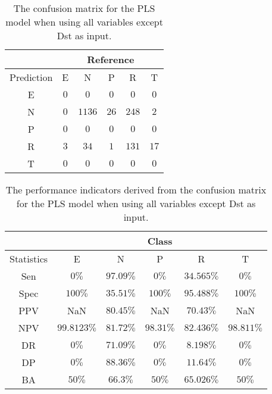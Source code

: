 \begin{table}[!ht]
	\centering
	\begin{tabular}{|c|c|c|c|c|c|}
		\hline
		 & \multicolumn{5}{|c|}{Reference} \\ \hline
		 Prediction & E & N & P & R & T \\ \hline
		 E & $0$ & $0$ & $0$ & $0$ & $0$ \\ \hline
		 N & $0$ & $1136$ & $26$ & $248$ & $2$ \\ \hline
		 P & $0$ & $0$ & $0$ & $0$ & $0$ \\ \hline
		 R & $3$ & $34$ & $1$ & $131$ & $17$ \\ \hline
		 T & $0$ & $0$ & $0$ & $0$ & $0$ \\ \hline
	\end{tabular}
	\caption{The confusion matrix for the PLS model when using all variables except Dst as input.}
	\label{tab:cm:noDst:pls}
\end{table}

\begin{table}[!ht]
	\centering
	\begin{tabular}{|c|c|c|c|c|c|}
		\hline
		 & \multicolumn{5}{c|}{Class} \\ \hline
		Statistics & E & N & P & R & T \\ \hline
		Sen & $0\%$ & $97.09\%$ & $0\%$ & $34.565\%$ & $0\%$ \\ \hline
		Spec & $100\%$ & $35.51\%$ & $100\%$ & $95.488\%$ & $100\%$ \\ \hline
		PPV & NaN & $80.45\%$ & NaN & $70.43\%$ & NaN \\ \hline
		NPV & $99.8123\%$ & $81.72\%$ & $98.31\%$ & $82.436\%$ & $98.811\%$ \\ \hline
		DR & $0\%$ & $71.09\%$ & $0\%$ & $8.198\%$ & $0\%$ \\ \hline
		DP & $0\%$ & $88.36\%$ & $0\%$ & $11.64\%$ & $0\%$ \\ \hline
		BA & $50\%$ & $66.3\%$ & $50\%$ & $65.026\%$ & $50\%$ \\ \hline
	\end{tabular}
	\caption{The performance indicators derived from the confusion matrix for the PLS model when using all variables except Dst as input.}
	\label{tab:cs:reverse:noDst:pls}
\end{table}


